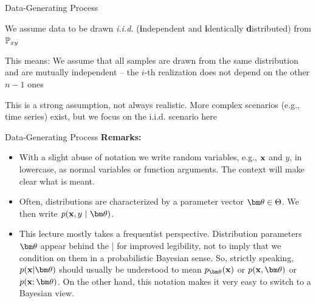 \documentclass[11pt,compress,t,notes=noshow, xcolor=table]{beamer}
\begin{document}
\begin{framei}{Data-Generating Process}
\item We assume data to be drawn \emph{i.i.d.} (\textbf{i}ndependent and \textbf{i}dentically \textbf{d}istributed) from $\mathbb{P}_{xy}$
\item This means: We assume that all samples are drawn from the same distribution and are mutually independent -- the $i$-th realization does not depend on the other $n-1$ ones
\item This is a strong assumption, not always realistic.
More complex scenarios (e.g., time series) exist, but we focus on the i.i.d. scenario here
\vfill
{}
\end{framei}


\begin{framev}{Data-Generating Process}
\textbf{Remarks:}
\begin{itemize}
\item With a slight abuse of notation we write random variables, e.g., $\mathbf{x}$ and $y$, in lowercase, as normal variables or function arguments. 
The context will make clear what is meant.
\item Often, distributions are characterized by a parameter vector $\thetav \in \Theta$. We then write $\pdfxyt$.
\item This lecture mostly takes a frequentist perspective. Distribution parameters $\thetav$ appear behind the | for improved legibility, not to imply that we condition on them in a probabilistic Bayesian sense.
So, strictly speaking, $p(\xv | \thetav)$ should usually be understood to mean $p_{\thetav}(\xv)$ or $p(\xv, \thetav)$ or $p(\xv; \thetav)$.
On the other hand, this notation makes it very easy to switch to a Bayesian view.
\end{itemize}
\end{framev}

\endlecture
\end{document}
